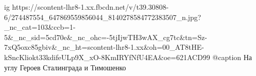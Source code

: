  
 
 
 
 

\ifcmt
  ig https://scontent-lhr8-1.xx.fbcdn.net/v/t39.30808-6/274487554_647869559856044_8140278584772383507_n.jpg?_nc_cat=103&ccb=1-5&_nc_sid=5cd70e&_nc_ohc=-5tjIjwTH3wAX_cg7tc&tn=Sz-7xQ5oxc85gbiv&_nc_ht=scontent-lhr8-1.xx&oh=00_AT8tHE-kSncKliokt33kdifeULp9X_xO-8KmIRYfNfU4EA&oe=621ACD99
	@caption На углу Героев Сталинграда и Тимошенко
\fi
